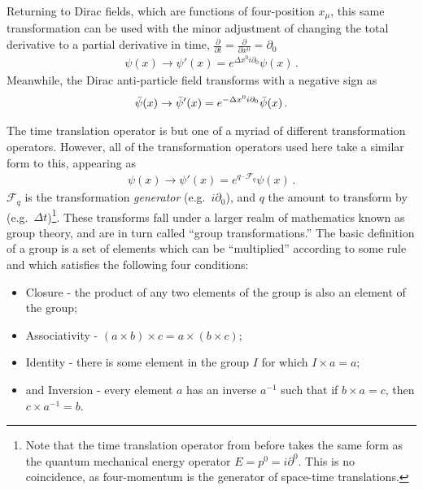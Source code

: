     Returning to Dirac fields, which are functions of four-position $x_\mu$, this same transformation can be used
         with the minor adjustment of changing the total derivative to a partial derivative in time,
         $\frac{\partial}{\partial t} = \frac{\partial}{\partial x^0} = \partial_0$
    \begin{equation} \begin{split}
    \psi(x) \to \psi'(x) = e^{\Delta x^0 i \partial_0} \psi(x)
    \,.
    \end{split} \end{equation}
    Meanwhile, the Dirac anti-particle field transforms with a negative sign as
    \begin{equation} \begin{split}
    \bar{\psi}(x) \to \bar{\psi}'(x) = e^{-\Delta x^0 i \partial_0} \bar{\psi}(x)
    \,.
    \end{split} \end{equation}
    
    The time translation operator is but one of a myriad of different transformation operators.
    However, all of the transformation operators used here take a similar form to this, appearing as
    \begin{equation} \begin{split}
        \psi(x) \to \psi'(x) = e^{ q \cdot \mathcal{F}_q } \psi(x)
        \,.
    \end{split} \end{equation}
    $\mathcal{F}_q$ is the transformation \textit{generator} (e.g.\ $i\partial_0$),
        and $q$ the amount to transform by (e.g.\ $\Delta t$)\footnote{
            Note that the time translation operator from before takes the same form as the quantum mechanical energy operator
                $E = p^0 = i\partial^0$.
            This is no coincidence, as four-momentum is the generator of space-time translations.
         }.
    These transforms fall under a larger realm of mathematics known as group theory,
        and are in turn called ``group transformations.''
    The basic definition of a group is a set of elements which can be ``multiplied'' according to some rule
        and which satisfies the following four conditions\cite{Cheng_book}:
    \begin{itemize}
        \item Closure - the product of any two elements of the group is also an element of the group;
        \item Associativity - $(a \times b)\times c = a\times(b \times c)$;
        \item Identity - there is some element in the group $I$ for which $I \times a=a$;
        \item and Inversion - every element $a$ has an inverse $a^{-1}$ such that if $b \times a = c$,
            then $c \times a^{-1} = b$.
    \end{itemize}

